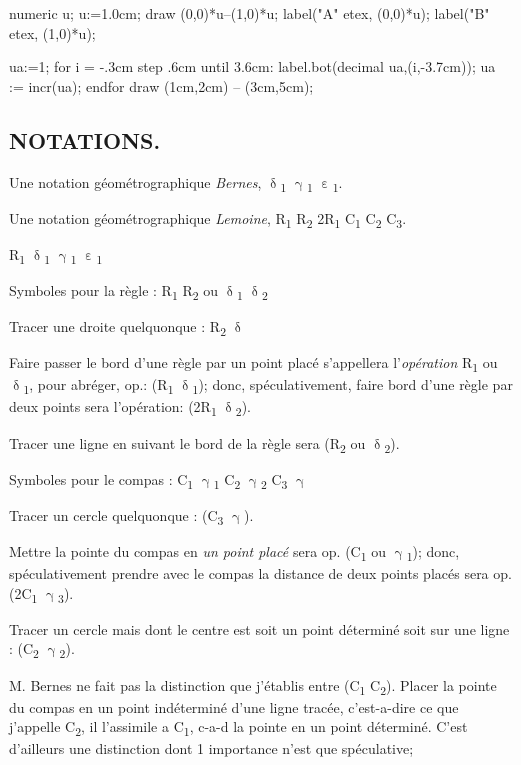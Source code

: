 \documentclass[12pt,a4paper,twocolumn]{book} %
\newcommand{\Ra}[1]{\textcolor{rtLightBlue900}R\textsubscript{\textcolor{rtLightBlue900}{#1}}}
\newcommand{\Rab}[1]{\small{\textcolor{rtLightBlue900}{2}}\textcolor{rtLightBlue900}R\textsubscript{\textcolor{rtLightBlue900}{#1}}}
\newcommand{\gd}[1]{\textbf{$\updelta$}\textsubscript{#1}}
\newcommand{\gc}[1]{\textbf{$\upgamma$}\textsubscript{#1}}
\newcommand{\gq}[1]{\textbf{$\upepsilon$}\textsubscript{#1}}
\newcommand{\Ca}[1]{\textcolor{rtLightBlue900}C\textsubscript{\textcolor{rtLightBlue900}{#1}}}
\begin{document}
\begin{mpdisplay}
  numeric u; u:=1.0cm;
  draw (0,0)*u--(1,0)*u;
  label(\btex "A" etex, (0,0)*u);
  label(\btex "B" etex, (1,0)*u);
\end{mpdisplay}

\begin{mpdisplay}
  ua:=1;
  for i = -.3cm step .6cm until 3.6cm:
  label.bot(decimal ua,(i,-3.7cm));
  ua := incr(ua);
  endfor
  draw (1cm,2cm) -- (3cm,5cm);
\end{mpdisplay}


\subsection{NOTATIONS.}

Une notation géométrographique \emph{Bernes},  \gd{1} \gc{1} \gq{1}.

Une notation géométrographique \emph{Lemoine}, \Ra{1} \Ra{2} \Rab{1} \Ca{1} \Ca{2} \Ca{3}.


\Ra{1} \gd{1} \gc{1} \gq{1}

Symboles pour la règle : \Ra{1} \Ra{2} ou \gd{1} \gd{2}


Tracer une droite quelquonque : \Ra{2}  \gd{}

Faire passer le bord d'une règle par un point placé s'appellera l'\emph{opération} \Ra{1} ou \gd{1}, pour abréger, op.: (\Ra{1} \gd{1}); donc, spéculativement, faire bord d'une règle par deux points sera l'opération: (\Rab{1}  \gd{2}).


Tracer une ligne en suivant le bord de la règle sera (\Ra{2} ou \gd{2}).

Symboles pour le compas : \Ca{1} \gc{1} \Ca{2} \gc{2} \Ca{3}  \gc{}

Tracer un cercle quelquonque : (\Ca{3} \gc{}).


Mettre la pointe du compas en \emph{un point placé} sera op. (\Ca{1} ou \gc{1}); donc, spéculativement prendre avec le compas la distance de deux points placés sera op. (2\Ca{1} \gc{3}).

Tracer un cercle mais dont le centre est soit un point déterminé soit sur une ligne  : (\Ca{2} \gc{2}).




M. Bernes ne fait pas la distinction que j'établis entre (\Ca{1} \Ca{2}). Placer la pointe du compas en un point indéterminé d'une ligne tracée, c'est-a-dire ce que j'appelle \Ca{2}, il l'assimile a
\Ca{1}, c-a-d la pointe en un point déterminé. C'est d'ailleurs
une distinction dont 1 importance n'est que spéculative;
\end{document}
